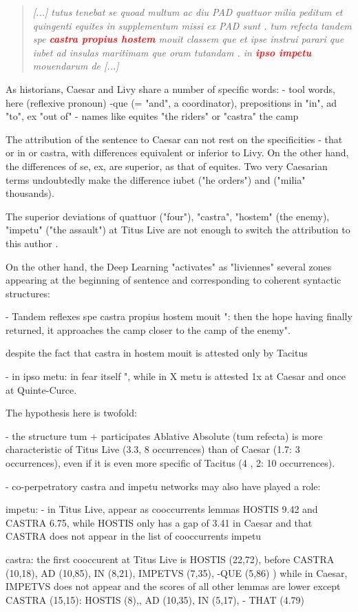 \begin{quote}
\textit{[...] tutus tenebat se quoad multum ac diu PAD quattuor milia peditum et quingenti equites in supplementum missi ex PAD sunt . tum refecta tandem spe \textcolor{red}{\textbf{castra propius hostem}} mouit classem que et ipse instrui parari que iubet ad insulas maritimam que oram tutandam . in \textcolor{red}{\textbf{ipso impetu}} mouendarum de [...]} 
\end{quote}

As historians, Caesar and Livy share a number of specific words:
- tool words, here (reflexive pronoun) -que (= "and", a coordinator), prepositions in "in", ad "to", ex "out of"
- names like equites "the riders" or "castra" the camp

The attribution of the sentence to Caesar can not rest on the specificities - that or in or castra, with differences equivalent or inferior to Livy. On the other hand, the differences of se, ex, are superior, as that of equites. Two very Caesarian terms undoubtedly make the difference iubet ("he orders") and ("milia" thousands).

The superior deviations of quattuor ("four"), "castra", "hostem" (the enemy), "impetu" ("the assault") at Titus Live are not enough to switch the attribution to this author .

On the other hand, the Deep Learning "activates" as "liviennes" several zones appearing at the beginning of sentence and corresponding to coherent syntactic structures:

- Tandem reflexes spe castra propius hostem mouit ": then the hope having finally returned, it approaches the camp closer to the camp of the enemy".

despite the fact that castra in hostem mouit is attested only by Tacitus

- in ipso metu: in fear itself ", while in X metu is attested 1x at Caesar and once at Quinte-Curce.

The hypothesis here is twofold:

- the structure tum + participates Ablative Absolute (tum refecta) is more characteristic of Titus Live (3.3, 8 occurrences) than of Caesar (1.7: 3 occurrences), even if it is even more specific of Tacitus (4 , 2: 10 occurrences).

- co-perpetratory castra and impetu networks may also have played a role:

impetu:
- in Titus Live, appear as cooccurrents lemmas HOSTIS 9.42 and CASTRA 6.75, while HOSTIS only has a gap of 3.41 in Caesar and that CASTRA does not appear in the list of cooccurrents impetu

castra:
the first cooccurent at Titus Live is HOSTIS (22,72), before CASTRA (10,18), AD (10,85), IN (8,21), IMPETVS (7,35), -QUE (5,86) )
while in Caesar, IMPETVS does not appear and the scores of all other lemmas are lower except CASTRA (15,15): HOSTIS (8),, AD (10,35), IN (5,17), - THAT (4.79)


